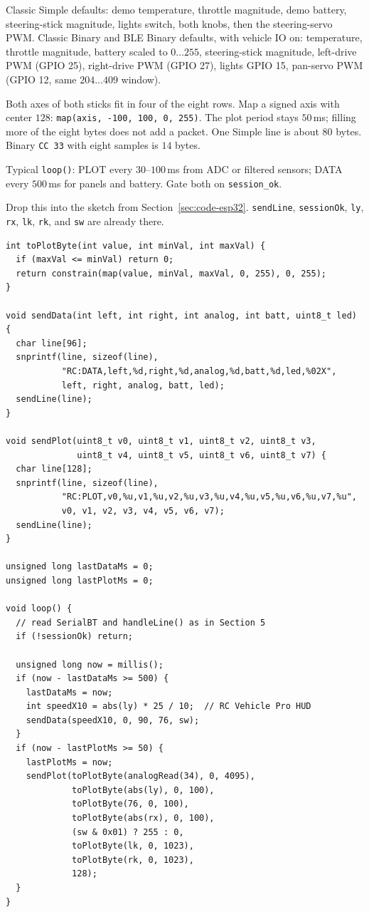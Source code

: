 \documentclass[12pt,a4paper]{article}
\begin{document}
Classic Simple defaults: demo temperature, throttle magnitude, demo battery,
steering-stick magnitude, lights switch, both knobs, then the steering-servo
PWM. Classic Binary and BLE Binary defaults, with vehicle IO on: temperature,
throttle magnitude, battery scaled to $0\ldots 255$, steering-stick magnitude,
left-drive PWM (GPIO 25), right-drive PWM (GPIO 27), lights GPIO 15, pan-servo
PWM (GPIO 12, same $204\ldots 409$ window).

Both axes of both sticks fit in four of the eight rows. Map a signed axis
with center $128$: \texttt{map(axis, -100, 100, 0, 255)}. The plot period
stays $50$\,ms; filling more of the eight bytes does not add a packet.
One Simple line is about $80$ bytes. Binary \texttt{CC 33} with eight
samples is $14$ bytes.

Typical \texttt{loop()}: PLOT every $30$--$100$\,ms from ADC or filtered
sensors; DATA every $500$\,ms for panels and battery. Gate both on
\texttt{session\_ok}.

Drop this into the sketch from Section~\ref{sec:code-esp32}.
\texttt{sendLine}, \texttt{sessionOk}, \texttt{ly}, \texttt{rx}, \texttt{lk},
\texttt{rk}, and \texttt{sw} are already there.

\begin{lstlisting}
int toPlotByte(int value, int minVal, int maxVal) {
  if (maxVal <= minVal) return 0;
  return constrain(map(value, minVal, maxVal, 0, 255), 0, 255);
}

void sendData(int left, int right, int analog, int batt, uint8_t led) {
  char line[96];
  snprintf(line, sizeof(line),
           "RC:DATA,left,%d,right,%d,analog,%d,batt,%d,led,%02X",
           left, right, analog, batt, led);
  sendLine(line);
}

void sendPlot(uint8_t v0, uint8_t v1, uint8_t v2, uint8_t v3,
              uint8_t v4, uint8_t v5, uint8_t v6, uint8_t v7) {
  char line[128];
  snprintf(line, sizeof(line),
           "RC:PLOT,v0,%u,v1,%u,v2,%u,v3,%u,v4,%u,v5,%u,v6,%u,v7,%u",
           v0, v1, v2, v3, v4, v5, v6, v7);
  sendLine(line);
}

unsigned long lastDataMs = 0;
unsigned long lastPlotMs = 0;

void loop() {
  // read SerialBT and handleLine() as in Section 5
  if (!sessionOk) return;

  unsigned long now = millis();
  if (now - lastDataMs >= 500) {
    lastDataMs = now;
    int speedX10 = abs(ly) * 25 / 10;  // RC Vehicle Pro HUD
    sendData(speedX10, 0, 90, 76, sw);
  }
  if (now - lastPlotMs >= 50) {
    lastPlotMs = now;
    sendPlot(toPlotByte(analogRead(34), 0, 4095),
             toPlotByte(abs(ly), 0, 100),
             toPlotByte(76, 0, 100),
             toPlotByte(abs(rx), 0, 100),
             (sw & 0x01) ? 255 : 0,
             toPlotByte(lk, 0, 1023),
             toPlotByte(rk, 0, 1023),
             128);
  }
}
\end{lstlisting}
\end{document}
